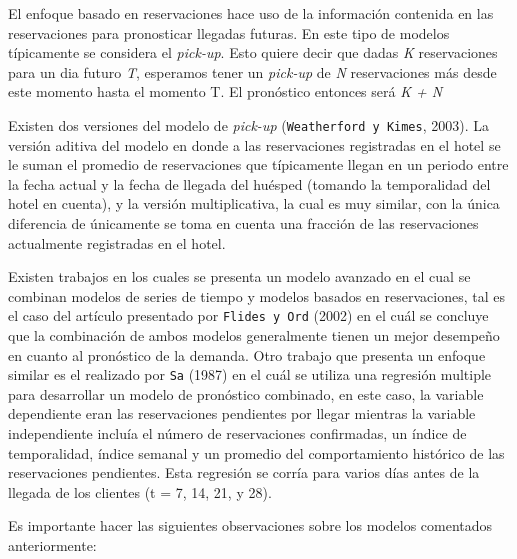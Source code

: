 {El enfoque basado en reservaciones hace uso de la información contenida en las reservaciones para pronosticar llegadas futuras. En este tipo de modelos típicamente se considera el \emph{pick-up}. Esto quiere decir que dadas \emph{K} reservaciones para un dia futuro \emph{T}, esperamos tener un \emph{pick-up} de \emph{N} reservaciones más desde este momento hasta el momento T. El pronóstico entonces será \emph{K + N}

Existen dos versiones del modelo de \emph{pick-up} (\texttt{Weatherford y Kimes}, 2003). La versión aditiva del modelo en donde a las reservaciones registradas en el hotel se le suman el promedio de reservaciones que típicamente llegan en un periodo entre la fecha actual y la fecha de llegada del huésped (tomando la temporalidad del hotel en cuenta), y la versión multiplicativa, la cual es muy similar, con la única diferencia de únicamente se toma en cuenta una fracción de las reservaciones actualmente registradas en el hotel.

Existen trabajos en los cuales se presenta un modelo avanzado en el cual se combinan modelos de series de tiempo y modelos basados en reservaciones, tal es el caso del artículo presentado por \texttt{Flides y Ord} (2002) en el cuál se concluye que la combinación de ambos modelos generalmente tienen un mejor desempeño en cuanto al pronóstico de la demanda. Otro trabajo que presenta un enfoque similar es el realizado por \texttt{Sa} (1987) en el cuál se utiliza una regresión multiple para desarrollar un modelo de pronóstico combinado, en este caso, la variable dependiente eran las reservaciones pendientes por llegar mientras la variable independiente incluía el número de reservaciones confirmadas, un índice de temporalidad,  índice semanal y un promedio del comportamiento histórico de las reservaciones pendientes. Esta regresión se corría para varios días antes de la llegada de los clientes (t = 7, 14, 21, y 28).

Es importante hacer las siguientes observaciones sobre los modelos comentados anteriormente:

}
